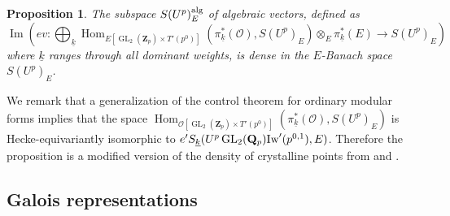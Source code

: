 \documentclass[leqno]{amsart}
\newtheorem{prop}[thm]{Proposition}
\theoremstyle{definition}
\theoremstyle{remark}
\newcommand{\oo}{\mathcal{O}}
\newcommand{\Qp}{\mathbf{Q}_p}
\newcommand{\Zp}{\mathbf{Z}_p}
\DeclareMathOperator{\Hom}{Hom}
\DeclareMathOperator{\Image}{Im}
\DeclareMathOperator{\GL}{GL}
\newcommand{\wt}[1]{\underline{ #1 }}
\newcommand{\Iw}{\textnormal{Iw}} %
\begin{document}
\begin{prop}\label{prop:density}
The subspace $S(U^p)_E^{\textnormal{alg}}$ 
of algebraic vectors, defined as
\[
\Image\left(ev\colon
\bigoplus_{\wt{k}}
\Hom_{E[\GL_2(\Zp)\times T'(p^0)]}(\pi_{\wt{k}}^*(\oo), S(U^p)_E)
\otimes_E \pi_{\wt{k}}^*(E)\rightarrow S(U^p)_E\right)
\]
where $\wt{k}$ ranges through all dominant weights,
is dense in the $E$-Banach space $S(U^p)_E$.
\end{prop}
We remark that a generalization of the control theorem
for ordinary modular forms implies that the space
$\Hom_{\oo[\GL_2(\Zp)\times T'(p^0)]}(\pi_{\wt{k}}^*(\oo), S(U^p)_E)$
is Hecke-equivariantly isomorphic to
$e'S_{\wt{k}}(U^p\GL_2(\Qp)\Iw'(p^{0,1}),E)$.
Therefore the proposition is a modified version of
the density of crystalline points from \cite{emeI} and \cite{pan}.  





\subsection{Galois representations}
\end{document}
